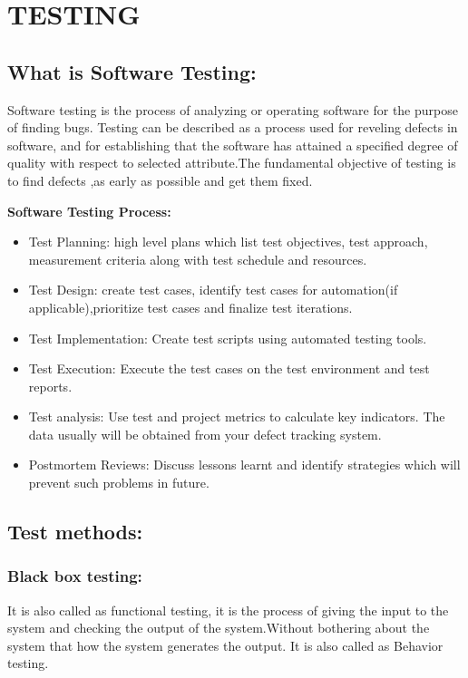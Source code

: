 \chapter{TESTING}

\section{What is Software Testing: }
Software testing is the process of analyzing or operating software for the purpose of finding bugs.
Testing can be described as a process used for reveling defects in software, and for establishing that the software has attained a specified degree of quality with respect to selected attribute.The fundamental objective of testing is to find defects ,as early as possible and get them fixed.

{\bf Software Testing Process: }
\begin{itemize}
\item Test Planning:
 high level plans which list test objectives, test approach, measurement criteria along with test schedule and resources.
 \item Test Design:
create test cases, identify test cases for automation(if applicable),prioritize test cases and finalize test iterations.
\item Test Implementation:
Create test scripts using automated testing tools.
\item Test Execution:
Execute the test cases on the test environment and test reports.
\item Test analysis:
Use test and project metrics to calculate key indicators. The data usually will be obtained from your defect tracking system.
\item Postmortem Reviews:
Discuss lessons learnt and identify strategies which will prevent such problems in future.
\end{itemize}

\section{Test methods: }
\subsection{Black box testing: }
It is also called as functional testing, it is the process of giving the input to the system and checking the output of the system.Without bothering about the system that how the system generates the output. It is also called as Behavior testing.

